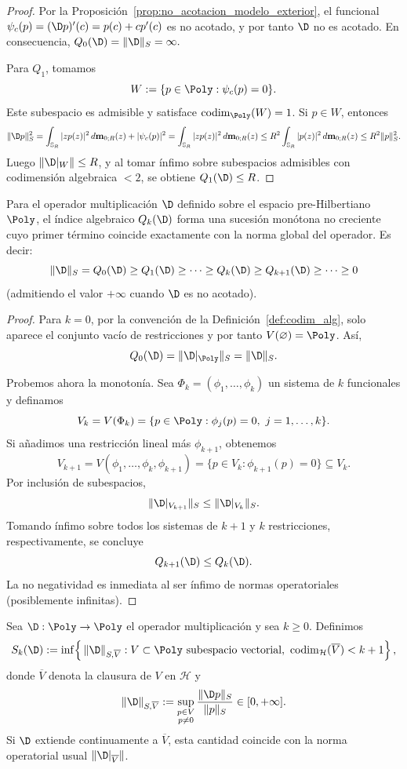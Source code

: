 \begin{proof}
	Por la Proposición~\ref{prop:no_acotacion_modelo_exterior}, el funcional
	\(
	\psi_c(p)=(\D p)'(c)=p(c)+cp'(c)
	\)
	es no acotado, y por tanto $\D$ no es acotado. En consecuencia,
	\(
	Q_0(\D)=\|\D\|_S=\infty.
	\)

	Para $Q_1$, tomamos
	\[
		W:=\{p\in\Poly:\psi_c(p)=0\}.
	\]
	Este subespacio es admisible y satisface $\operatorname{codim}_{\Poly}(W)=1$.
	Si $p\in W$, entonces
	\[
		\|\D p\|_S^2
		=
		\int_{\mathbb{S}_R}|zp(z)|^2\,d\mathbf m_{0;R}(z)
		+
		|\psi_c(p)|^2
		=
		\int_{\mathbb{S}_R}|zp(z)|^2\,d\mathbf m_{0;R}(z)
		\le
		R^2\int_{\mathbb{S}_R}|p(z)|^2\,d\mathbf m_{0;R}(z)
		\le
		R^2\|p\|_S^2.
	\]
	Luego $\|\D|_W\|\le R$, y al tomar ínfimo sobre subespacios
	admisibles con codimensión algebraica $<2$, se obtiene $Q_1(\D)\le R$.
\end{proof}

\begin{prop}\label{prop:propiedades_Qk}
	Para el operador multiplicación $\D$ definido sobre el espacio pre-Hilbertiano $\Poly$, el índice algebraico $Q_k(\D)$ forma una sucesión monótona no creciente cuyo primer término coincide exactamente con la norma global del operador. Es decir:
	$$ \|\D\|_S = Q_0(\D) \ge Q_1(\D) \ge \dots \ge Q_k(\D) \ge Q_{k+1}(\D) \ge \dots \ge 0 $$
	(admitiendo el valor $+\infty$ cuando $\D$ es no acotado).
\end{prop}

\begin{proof}
	Para $k=0$, por la convención de la Definición~\ref{def:codim_alg}, solo aparece el conjunto vacío de restricciones y por tanto $V(\varnothing)=\Poly$. Así,
	$$ Q_0(\D) = \|\D|_{\Poly}\|_S = \|\D\|_S. $$

	Probemos ahora la monotonía. Sea $\Phi_k=(\phi_1,\dots,\phi_k)$ un sistema de $k$ funcionales y definamos
	$$V_k=V(\Phi_k)=\{p\in\Poly:\phi_j(p)=0,\ j=1,\dots,k\}.$$
	Si añadimos una restricción lineal más $\phi_{k+1}$, obtenemos
	$$V_{k+1}=V(\phi_1,\dots,\phi_k,\phi_{k+1})=\{p\in V_k:\phi_{k+1}(p)=0\}\subseteq V_k.$$
	Por inclusión de subespacios,
	$$\|\D|_{V_{k+1}}\|_S\le \|\D|_{V_k}\|_S.$$
	Tomando ínfimo sobre todos los sistemas de $k+1$ y $k$ restricciones, respectivamente, se concluye
	$$Q_{k+1}(\D)\le Q_k(\D).$$
	La no negatividad es inmediata al ser ínfimo de normas operatoriales (posiblemente infinitas).
\end{proof}

\begin{defn}\label{def:indice_Sk}
	Sea $\D:\Poly\to\Poly$ el operador multiplicación y sea $k\ge 0$. Definimos
	\[
		S_k(\D)
		:=
		\inf\!\left\{\,\|\D\|_{S,\overline{V}}:
		V\subset\Poly\ \text{subespacio vectorial},\ \operatorname{codim}_{\mathcal{H}}(\overline{V})<k+1\right\},
	\]
	donde $\overline{V}$ denota la clausura de $V$ en $\mathcal{H}$ y
	\[
		\|\D\|_{S,\overline{V}}
		:=
		\sup_{\substack{p\in V\\ p\neq 0}}\frac{\|\D p\|_S}{\|p\|_S}
		\in [0,+\infty].
	\]
	Si $\D$ extiende continuamente a $\overline{V}$, esta cantidad coincide con la norma operatorial usual $\|\D|_{\overline{V}}\|$.
\end{defn}

